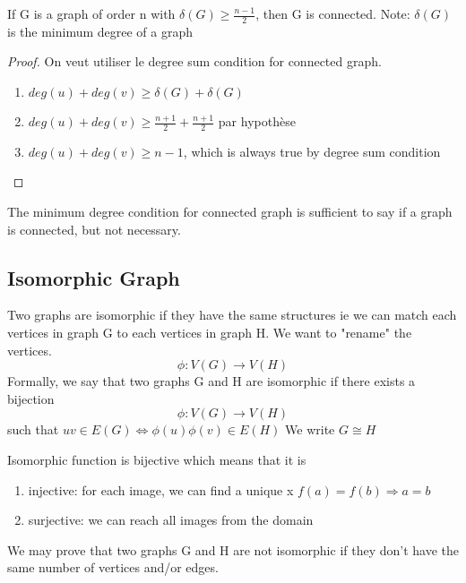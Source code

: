 \documentclass{article}
\begin{document}
\begin{theorem}
    If G is a graph of order n with $\delta(G) \geq \frac{n-1}{2} $,
    then G is connected. Note: $\delta(G)$ is the minimum degree of
    a graph
\end{theorem}

\begin{proof}
    On veut utiliser le degree sum condition for connected graph.
    \begin{enumerate}
	\item $deg(u)+deg(v) \geq \delta(G)+\delta(G)$
	\item $deg(u)+deg(v) \geq \frac{n+1}{2} + \frac{n+1}{2} $
	    par hypothèse
	\item $deg(u)+deg(v) \geq n-1$, which is always true by degree
	    sum condition
    \end{enumerate}
\end{proof}

\begin{remark}
    The minimum degree condition for connected graph is sufficient to say
    if a graph is connected, but not necessary.
\end{remark}

\subsection{Isomorphic Graph}%
\label{sub:Isomorphic Graph}

\begin{definition}
    Two graphs are isomorphic if they have the same structures ie we can
    match each vertices in graph G to each vertices in graph H. We want to
    "rename" the vertices.
    $$ \phi: V(G) \to V(H)$$
    Formally, we say that two graphs G and H are isomorphic if there exists
    a bijection $$ \phi: V(G) \to V(H)$$ such that $uv \in E(G)
    \Longleftrightarrow \phi(u) \phi(v) \in E(H)$
    We write $G \cong H$
\end{definition}

\begin{remark}
    Isomorphic function is bijective which means that it is
    \begin{enumerate}
        \item injective: for each image, we can find a unique x
	    $ f(a) = f(b) \Longrightarrow a=b$
	\item surjective: we can reach all images from the domain
    \end{enumerate}
    We may prove that two graphs G and H are not isomorphic if they don't
    have the same number of vertices and/or edges.
\end{remark}
\end{document}

